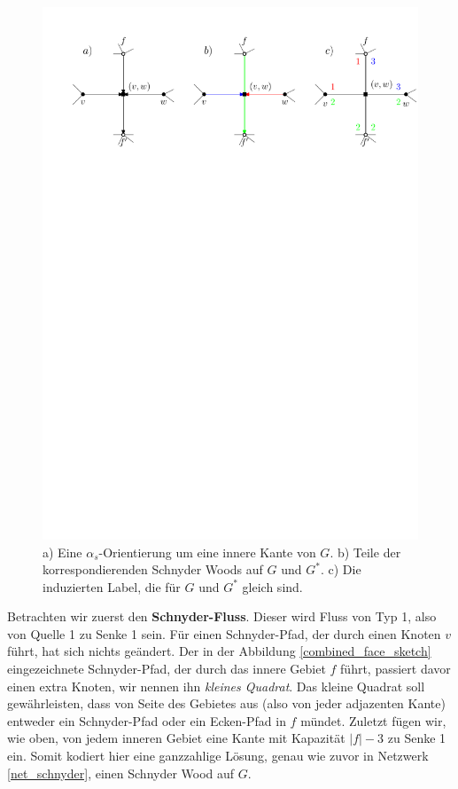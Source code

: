 \begin{figure}[h]
	\centering
  	\includegraphics[width=1\textwidth]{alpha_bij.pdf}
  	\caption{a) Eine $\alpha_s$-Orientierung um eine innere Kante von $G$. b) Teile der korrespondierenden Schnyder Woods auf $G$ und $G^*$. c) Die induzierten Label, die für $G$ und $G^*$ gleich sind.}
	\label{alpha_bij}
\end{figure}

Betrachten wir zuerst den \textbf{Schnyder-Fluss}. Dieser wird Fluss von Typ 1, also von Quelle 1 zu Senke 1 sein. Für einen Schnyder-Pfad, der durch einen Knoten $v$ führt, hat sich nichts geändert. Der in der Abbildung \ref{combined_face_sketch} eingezeichnete Schnyder-Pfad, der durch das innere Gebiet $f$ führt, passiert davor einen extra Knoten, wir nennen ihn \textit{kleines Quadrat}. Das kleine Quadrat soll gewährleisten, dass von Seite des Gebietes aus (also von jeder adjazenten Kante) entweder ein Schnyder-Pfad oder ein Ecken-Pfad in $f$ mündet. Zuletzt fügen wir, wie oben, von jedem inneren Gebiet eine Kante mit Kapazität $|f|-3$ zu Senke 1 ein. Somit kodiert hier eine ganzzahlige Lösung, genau wie zuvor in Netzwerk \ref{net_schnyder}, einen Schnyder Wood auf $G$.

